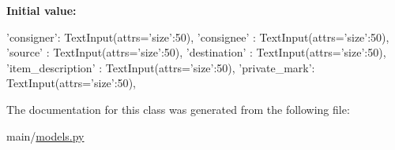 {\bfseries \-Initial value\-:}
\begin{DoxyCode}
{
                'consigner': TextInput(attrs={'size':50}),
                'consignee' : TextInput(attrs={'size':50}),
                'source' : TextInput(attrs={'size':50}),
                'destination' : TextInput(attrs={'size':50}),
                'item_description' : TextInput(attrs={'size':50}),
                'private_mark': TextInput(attrs={'size':50}),
                                }
\end{DoxyCode}


\-The documentation for this class was generated from the following file\-:\begin{DoxyCompactItemize}
\item 
main/\hyperlink{models_8py}{models.\-py}\end{DoxyCompactItemize}

